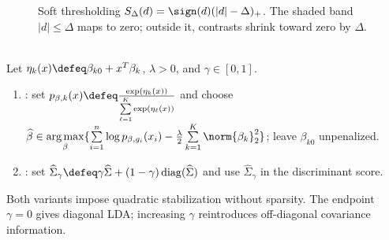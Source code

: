 \begin{figure}[H]
\centering

\caption{Soft thresholding $S_\Delta(d)=\sign(d)(|d|-\Delta)_+$.  The shaded band $|d|\le\Delta$ maps to zero; outside it, contrasts shrink toward zero by $\Delta$.}
\label{fig:sl-soft-thresholding-rule}
\end{figure}

\begin{method} \label{meth:sl-quadratic-regularized-high-dimensional-linear-rules} \\
Let $\eta_k(x)\defeq\beta_{k0}+x^T\beta_k$, $\lambda>0$, and $\gamma\in[0,1]$.
\begin{enumerate}[label=(\roman*)]
\setlength{\itemsep}{0pt}
\item {}: set $p_{\beta,k}(x)\defeq\frac{\exp(\eta_k(x))}{\sum\limits_{\ell=1}^K\exp(\eta_\ell(x))}$ and choose $\widehat{\beta}\in\operatorname*{arg\,max}\limits_{\beta}\{\sum\limits_{i=1}^n\log p_{\beta,g_i}(x_i)-\frac{\lambda}{2}\sum\limits_{k=1}^K\norm{\beta_k}_2^2\}$; leave $\beta_{k0}$ unpenalized.
\item {}: set $\widehat{\Sigma}_\gamma\defeq\gamma\widehat{\Sigma}+(1-\gamma)\operatorname{diag}(\widehat{\Sigma})$ and use $\widehat{\Sigma}_\gamma$ in the discriminant score.
\end{enumerate}
Both variants impose quadratic stabilization without sparsity. The endpoint $\gamma=0$ gives diagonal LDA; increasing $\gamma$ reintroduces off-diagonal covariance information.
\end{method}

